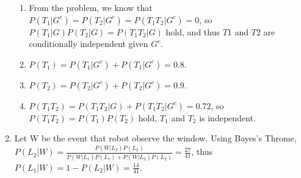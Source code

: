 \documentclass{article}
\begin{document}
\begin{enumerate}
\begin{enumerate}
	\item From the problem, we know that $P(T_1 |G^c)=P(T_2 |G^c)=P(T_1 T_2 |G^c)=0$, so $P(T_1 |G)P(T_2 |G)=P(T_1 T_2 | G)$ hold, and thus $T 1$ and $T 2$  are conditionally independent given $G^c$.
	\item $P(T_1)=P(T_1 | G^c)+P(T_1 |G^c)=0.8$.
	\item $P(T_2)=P(T_2 | G^c)+P(T_2 |G^c)=0.9$.
	\item $P(T_1 T_2 )=P(T_1 T_2 | G)+P(T_1 T_2 | G^c)=0.72 $, so $P(T_1 T_2 )=P(T_1 )P(T_2 )$ hold, $T_1$ and $T_2$ is independent.
	\end{enumerate}
	\item Let W be the event that robot observe the window. Using Bayes's Throme, $P(L_2 | W)=\frac{P(W|L_2 ) P(L_2 )}{P(W|L_1 )P(L_1 ) + P(W|L_2 ) P(L_2 )}=\frac{27}{41}$, thus $P(L_1 | W)=1-P(L_2 | W)=\frac{14}{41}$.
\end{enumerate}
\end{document}
